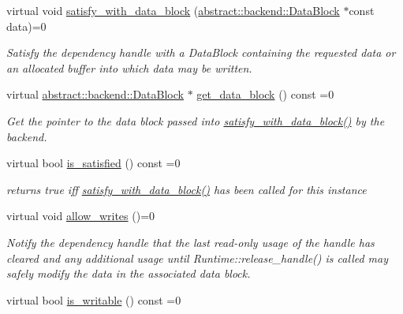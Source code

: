 \begin{DoxyCompactItemize}
virtual void \hyperlink{classdarma__runtime_1_1abstract_1_1frontend_1_1_dependency_handle_ae8fd943e2ccf822ebcf1843a1b38db5c}{satisfy\+\_\+with\+\_\+data\+\_\+block} (\hyperlink{classdarma__runtime_1_1abstract_1_1backend_1_1_data_block}{abstract\+::backend\+::\+Data\+Block} $\ast$const data)=0
\begin{DoxyCompactList}\small\item\em Satisfy the dependency handle with a Data\+Block containing the requested data or an allocated buffer into which data may be written. \end{DoxyCompactList}\item 
virtual \hyperlink{classdarma__runtime_1_1abstract_1_1backend_1_1_data_block}{abstract\+::backend\+::\+Data\+Block} $\ast$ \hyperlink{classdarma__runtime_1_1abstract_1_1frontend_1_1_dependency_handle_a9ad7b36f78deeeb2e4dce50da1cece39}{get\+\_\+data\+\_\+block} () const  =0
\begin{DoxyCompactList}\small\item\em Get the pointer to the data block passed into \hyperlink{classdarma__runtime_1_1abstract_1_1frontend_1_1_dependency_handle_ae8fd943e2ccf822ebcf1843a1b38db5c}{satisfy\+\_\+with\+\_\+data\+\_\+block()} by the backend. \end{DoxyCompactList}\item 
virtual bool \hyperlink{classdarma__runtime_1_1abstract_1_1frontend_1_1_dependency_handle_acd5151a52a934a1a010975d692898c88}{is\+\_\+satisfied} () const  =0\hypertarget{classdarma__runtime_1_1abstract_1_1frontend_1_1_dependency_handle_acd5151a52a934a1a010975d692898c88}{}\label{classdarma__runtime_1_1abstract_1_1frontend_1_1_dependency_handle_acd5151a52a934a1a010975d692898c88}

\begin{DoxyCompactList}\small\item\em returns true iff \hyperlink{classdarma__runtime_1_1abstract_1_1frontend_1_1_dependency_handle_ae8fd943e2ccf822ebcf1843a1b38db5c}{satisfy\+\_\+with\+\_\+data\+\_\+block()} has been called for this instance \end{DoxyCompactList}\item 
virtual void \hyperlink{classdarma__runtime_1_1abstract_1_1frontend_1_1_dependency_handle_a390a3d8ef0f1ef7f1603b53f820e197b}{allow\+\_\+writes} ()=0
\begin{DoxyCompactList}\small\item\em Notify the dependency handle that the last read-\/only usage of the handle has cleared and any additional usage until Runtime\+::release\+\_\+handle() is called may safely modify the data in the associated data block. \end{DoxyCompactList}\item 
virtual bool \hyperlink{classdarma__runtime_1_1abstract_1_1frontend_1_1_dependency_handle_a5c0e9e43c41a1e8d3cd5104ad9cb5a54}{is\+\_\+writable} () const  =0\hypertarget{classdarma__runtime_1_1abstract_1_1frontend_1_1_dependency_handle_a5c0e9e43c41a1e8d3cd5104ad9cb5a54}{}\label{classdarma__runtime_1_1abstract_1_1frontend_1_1_dependency_handle_a5c0e9e43c41a1e8d3cd5104ad9cb5a54}


\end{DoxyCompactItemize}
